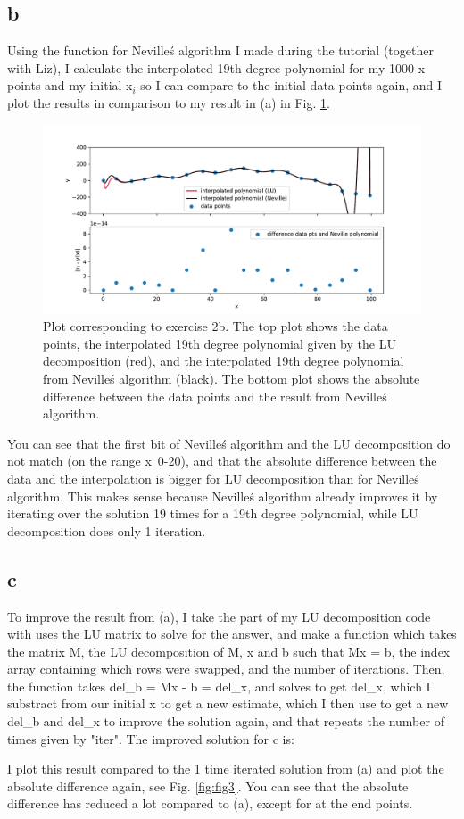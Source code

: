 \subsection{b}
Using the function for Neville\'s algorithm I made during the tutorial (together with Liz), I calculate the interpolated 19th degree polynomial for my 1000 x points and my initial x$_i$ so I can compare to the initial data points again, and I plot the results in comparison to my result in (a) in Fig. \ref{fig:fig2}.

\begin{figure}[h!]
  \centering
  \includegraphics[width=0.9\linewidth]{NUR1_Q2_plot2.pdf}
  \caption{Plot corresponding to exercise 2b. The top plot shows the data points, the interpolated 19th degree polynomial given by the LU decomposition (red), and the interpolated 19th degree polynomial from Neville\'s algorithm (black). The bottom plot shows the absolute difference between
  the data points and the result from Neville\'s algorithm.}
  \label{fig:fig2}
\end{figure} 

You can see that the first bit of Neville\'s algorithm and the LU decomposition do not match (on the range x~0-20), and that the absolute difference between the data and the interpolation is bigger for LU decomposition than for Neville\'s algorithm. 
This makes sense because Neville\'s algorithm already improves it by iterating over the solution 19 times for a 19th degree polynomial, while LU decomposition does only 1 iteration. 


\subsection{c}
To improve the result from (a), I take the part of my LU decomposition code with uses the LU matrix to solve for the answer, and make a function which takes the matrix M, the LU decomposition of M, x and b such that Mx = b, the index array containing which rows were swapped, and the number of iterations.
Then, the function takes del_b = Mx - b = del_x, and solves to get del_x, which I substract from our initial x to get a new estimate, which I then use to get a new del_b and del_x to improve the solution again, and that repeats the number of times given by "iter". 
The improved solution for c is: 

I plot this result compared to the 1 time iterated solution from (a) and plot the absolute difference again, see Fig. \ref{fig:fig3}. You can see that the absolute difference has reduced a lot compared to (a), except for at the end points.


